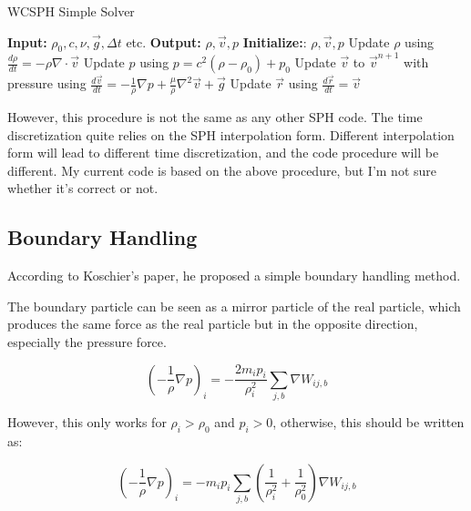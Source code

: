 \documentclass[10pt, oneside]{article}
\begin{document}
\begin{algorithm}[H]
    \caption{WCSPH Simple Solver}
    \begin{algorithmic}[1]
        \State \textbf{Input:} $\rho_0, c, \nu, \vec{g}, \Delta t$ etc.
        \State \textbf{Output:} $\rho, \vec{v}, p$
        \State \textbf{Initialize:}: $\rho, \vec{v}, p$
                \State Update $\rho$ using $\frac{d\rho}{dt}= -\rho \nabla\cdot \vec{v}$
            \EndFor
                \State Update $p$ using $p = c^2(\rho - \rho_0)+p_0$
            \EndFor
                \State Update $\vec{v}$ to $\vec{v}^{n+1}$ with pressure using $\frac{d\vec{v}}{dt}= -\frac{1}{\rho}\nabla p+\frac{\mu}{\rho} \nabla^2 \vec{v}+\vec{g}$
                \State Update $\vec{r}$ using $\frac{d\vec{r}}{dt}= \vec{v}$
            \EndFor
        \EndWhile
    \end{algorithmic}
\end{algorithm}

However, this procedure is not the same as any other SPH code. 
The time discretization quite relies on the SPH interpolation form. 
Different interpolation form will lead to different time discretization, 
and the code procedure will be different. 
My current code is based on the above procedure, 
but I'm not sure whether it's correct or not.

\subsection{Boundary Handling}

According to Koschier's paper, he proposed a simple boundary handling method.

The boundary particle can be seen as a mirror particle of the real particle, 
which produces the same force as the real particle but in the opposite direction, 
especially the pressure force.

\begin{equation}
    \left(-\frac{1}{\rho}\nabla p\right)_{i}=
    -\frac{2m_{i}p_i}{\rho_{i}^2}\sum_{j,b}\nabla W_{ij,b}
\end{equation}

However, this only works for $\rho_i>\rho_0$ and $p_i>0$,  
otherwise, this should be written as:

\begin{equation}
    \left(-\frac{1}{\rho}\nabla p\right)_{i}=
    -m_ip_i\sum_{j,b}\left(
        \frac{1}{\rho_i^2}+\frac{1}{\rho_0^2}
    \right)
    \nabla W_{ij,b}
\end{equation}
\end{document}
